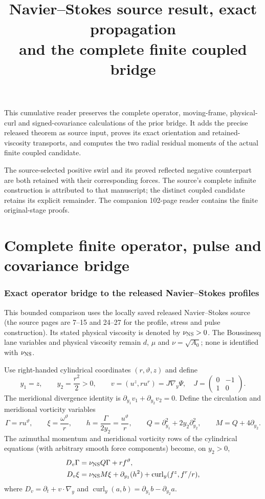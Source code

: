 \documentclass[11pt]{article}
\title{Navier--Stokes source result, exact propagation\\
and the complete finite coupled bridge}
\author{}\date{}
\begin{document}
\maketitle
This cumulative reader preserves the complete operator, moving-frame,
physical-curl and signed-covariance calculations of the prior bridge.
It adds the precise released theorem as source input, proves its exact
orientation and retained-viscosity transports, and computes the two
radial residual moments of the actual finite coupled candidate.

The source-selected positive swirl and its proved reflected negative
counterpart are both retained with their corresponding forces.
The source's complete infinite construction is attributed to that
manuscript; the distinct coupled candidate retains its explicit remainder.
The companion 102-page reader contains the finite original-stage proofs.

\tableofcontents\clearpage
\part{Complete finite operator, pulse and covariance bridge}
\section{Exact operator bridge to the released Navier--Stokes profiles}
\label{nsbridge:nsb:operator}

This bounded comparison uses the locally saved released Navier--Stokes source
(the source pages are 7--15 and 24--27 for the profile, stress and pulse
construction). Its stated physical viscosity is denoted by $\nu_{\rm NS}>0$.
The Boussinesq lane variables and physical viscosity remain $d$, $\mu$ and
$\nu=\sqrt{A_0}$; none is identified with $\nu_{\rm NS}$.

Use right-handed cylindrical coordinates $(r,\vartheta,z)$ and define
\[
 y_1=z,\qquad y_2=\frac{r^2}{2}>0,\qquad
 v=(u^z,ru^r)=J\nabla_y\Psi,
 \quad J=\begin{pmatrix}0&-1\\1&0\end{pmatrix}.
\]
The meridional divergence identity is
$\partial_{y_1}v_1+\partial_{y_2}v_2=0$. Define the circulation and
meridional vorticity variables
\[
 \Gamma=ru^\vartheta,
 \qquad \xi=\frac{\omega^\vartheta}{r},
 \qquad h=\frac{\Gamma}{2y_2}=\frac{u^\vartheta}{r},
 \qquad Q=\partial_{y_1}^2+2y_2\partial_{y_2}^2,
 \qquad M=Q+4\partial_{y_2}.
\]
The azimuthal momentum and meridional vorticity rows of the cylindrical
equations (with arbitrary smooth force components) become, on $y_2>0$,
\begin{align}
 D_v\Gamma&=\nu_{\rm NS}Q\Gamma+r f^\vartheta,
 \label{nsbridge:nsb:Gamma}\\
 D_v\xi&=\nu_{\rm NS}M\xi+\partial_{y_1}(h^2)
       +\operatorname{curl}_y(f^z,f^r/r),
 \label{nsbridge:nsb:xi}
\end{align}
where $D_v=\partial_t+v\cdot\nabla_y$ and
$\operatorname{curl}_y(a,b)=\partial_{y_1}b-\partial_{y_2}a$.
\end{document}
